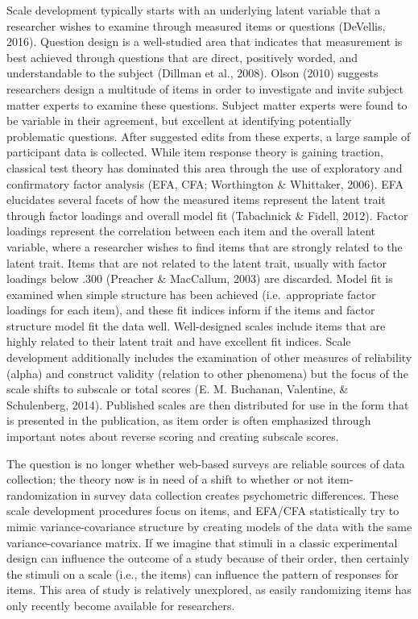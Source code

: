 \documentclass[english,man, mask]{apa6}
\theoremstyle{definition}
\theoremstyle{definition}
\theoremstyle{definition}
\theoremstyle{remark}
\begin{document}
Scale development typically starts with an underlying latent variable
that a researcher wishes to examine through measured items or questions
(DeVellis, 2016). Question design is a well-studied area that indicates
that measurement is best achieved through questions that are direct,
positively worded, and understandable to the subject (Dillman et al.,
2008). Olson (2010) suggests researchers design a multitude of items in
order to investigate and invite subject matter experts to examine these
questions. Subject matter experts were found to be variable in their
agreement, but excellent at identifying potentially problematic
questions. After suggested edits from these experts, a large sample of
participant data is collected. While item response theory is gaining
traction, classical test theory has dominated this area through the use
of exploratory and confirmatory factor analysis (EFA, CFA; Worthington
\& Whittaker, 2006). EFA elucidates several facets of how the measured
items represent the latent trait through factor loadings and overall
model fit (Tabachnick \& Fidell, 2012). Factor loadings represent the
correlation between each item and the overall latent variable, where a
researcher wishes to find items that are strongly related to the latent
trait. Items that are not related to the latent trait, usually with
factor loadings below .300 (Preacher \& MacCallum, 2003) are discarded.
Model fit is examined when simple structure has been achieved
(i.e.~appropriate factor loadings for each item), and these fit indices
inform if the items and factor structure model fit the data well.
Well-designed scales include items that are highly related to their
latent trait and have excellent fit indices. Scale development
additionally includes the examination of other measures of reliability
(alpha) and construct validity (relation to other phenomena) but the
focus of the scale shifts to subscale or total scores (E. M. Buchanan,
Valentine, \& Schulenberg, 2014). Published scales are then distributed
for use in the form that is presented in the publication, as item order
is often emphasized through important notes about reverse scoring and
creating subscale scores.

The question is no longer whether web-based surveys are reliable sources
of data collection; the theory now is in need of a shift to whether or
not item-randomization in survey data collection creates psychometric
differences. These scale development procedures focus on items, and
EFA/CFA statistically try to mimic variance-covariance structure by
creating models of the data with the same variance-covariance matrix. If
we imagine that stimuli in a classic experimental design can influence
the outcome of a study because of their order, then certainly the
stimuli on a scale (i.e., the items) can influence the pattern of
responses for items. This area of study is relatively unexplored, as
easily randomizing items has only recently become available for
researchers.
\end{document}
